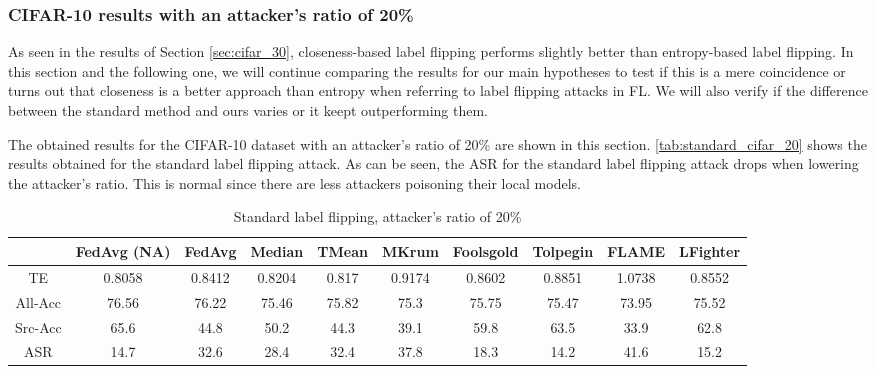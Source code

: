 \subsubsection{CIFAR-10 results with an attacker's ratio of 20\%}
As seen in the results of Section \ref{sec:cifar_30}, closeness-based label flipping performs slightly better than entropy-based label flipping. In this section and the following one, we will continue comparing the results for our main hypotheses to test if this is a mere coincidence or turns out that closeness is a better approach than entropy when referring to label flipping attacks in FL.
We will also verify if the difference between the standard method and ours varies or it keept outperforming them.

The obtained results for the CIFAR-10 dataset with an attacker's ratio of 20\% are shown in this section.
\autoref{tab:standard_cifar_20} shows the results obtained for the standard label flipping attack. As can be seen, the ASR for the standard label flipping attack drops when lowering the attacker's ratio. This is normal since there are less attackers poisoning their local models.

\begin{table}[h!]
        \centering
        \small
        \begin{adjustbox}{center}
        \begin{tabular}{|c|c|c|c|c|c|c|c|c|c|}
                \hline
                & FedAvg (NA) & FedAvg & Median & TMean & MKrum & Foolsgold & Tolpegin & FLAME & LFighter \\
                \hline
                TE & 0.8058 & 0.8412 & 0.8204 & 0.817 & 0.9174 & 0.8602 & 0.8851 & 1.0738 & 0.8552 \\
                \hline
                All-Acc & 76.56 & 76.22 & 75.46 & 75.82 & 75.3 & 75.75 & 75.47 & 73.95 & 75.52 \\
                \hline
                Src-Acc & 65.6 & 44.8 & 50.2 & 44.3 & 39.1 & 59.8 & 63.5 & 33.9 & 62.8 \\
                \hline
                ASR & 14.7 & 32.6 & 28.4 & 32.4 & 37.8 & 18.3 & 14.2 & 41.6 & 15.2 \\
                \hline
        \end{tabular}
        \end{adjustbox}
        \caption{Standard label flipping, attacker's ratio of 20\%}
        \label{tab:standard_cifar_20}
    \end{table}
    
